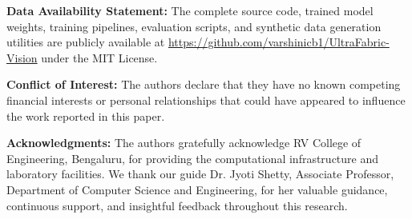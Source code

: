 \documentclass[journal]{IEEEtran}
\begin{document}
\vspace{12pt}
\noindent\textbf{Data Availability Statement:} The complete source code, trained model weights, training pipelines, evaluation scripts, and synthetic data generation utilities are publicly available at \url{https://github.com/varshinicb1/UltraFabric-Vision} under the MIT License.

\noindent\textbf{Conflict of Interest:} The authors declare that they have no known competing financial interests or personal relationships that could have appeared to influence the work reported in this paper.

\noindent\textbf{Acknowledgments:} The authors gratefully acknowledge RV College of Engineering, Bengaluru, for providing the computational infrastructure and laboratory facilities. We thank our guide Dr. Jyoti Shetty, Associate Professor, Department of Computer Science and Engineering, for her valuable guidance, continuous support, and insightful feedback throughout this research.
\end{document}
